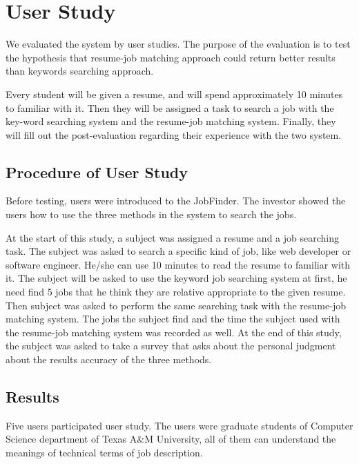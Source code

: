 \section{User Study}

We evaluated the system by user studies. The purpose of the evaluation is to test the hypothesis that resume-job matching approach could return better results than keywords searching approach.

Every student will be given a resume, and will spend approximately 10 minutes to familiar with it.
Then they will be assigned a task to search a job with the key-word searching system and the resume-job matching system. Finally, they will fill out the post-evaluation regarding their experience with the two system.

\subsection{Procedure of User Study}

Before testing, users were introduced to the JobFinder. The investor showed the users how to use the three methods in the system to search the jobs.

At the start of this study, a subject was assigned a resume and a job searching task.  The subject was asked to search a specific kind of job, like web developer or software engineer. He/she can use 10 minutes to read the resume to familiar with it.  The subject will be asked to use the keyword job searching system at first,  he need find 5 jobs that he think they are relative appropriate to the given resume. Then subject was asked to perform the same searching task with the resume-job matching system. The jobs the subject find and the time the subject used with the resume-job matching system was recorded as well. At the end of this study, the subject was asked to take a survey that asks about the personal judgment about the results accuracy of the three methods. 


\subsection{Results}
Five users participated user study. The users were graduate students of Computer Science department of Texas A\&M University, all of them can understand the meanings of technical terms of job description.



